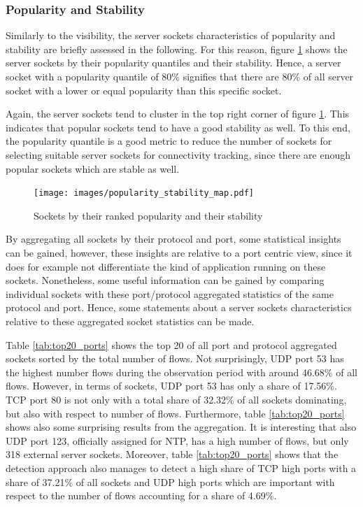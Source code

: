 \subsubsection{Popularity and Stability}

Similarly to the visibility, the \glspl{server socket} characteristics of popularity and stability are briefly assessed in the following. 
For this reason, figure \ref{fig:rankedPopularity} shows the \glspl{server socket} by their popularity quantiles and their stability. 
Hence, a \gls{server socket} with a popularity quantile of 80\% signifies that there are 80\% of all \gls{server socket} with a lower or equal popularity than this specific socket.

Again, the \glspl{server socket} tend to cluster in the top right corner of figure \ref{fig:rankedPopularity}. This indicates that popular sockets tend to have a good stability as well.
To this end, the popularity quantile is a good metric to reduce the number of sockets for selecting suitable server sockets for connectivity tracking, since there are enough popular sockets which are stable as well. 
\begin{figure}
	[ht] \centering 
	\texttt{[image: images/popularity\_stability\_map.pdf]} \caption{Sockets by their ranked popularity and their stability} 
	\label{fig:rankedPopularity} 
\end{figure}

By aggregating all sockets by their protocol and port, some statistical insights can be gained, however, these insights are relative to a port centric view, since it does for example not differentiate the kind of application running on these sockets. 
Nonetheless, some useful information can be gained by comparing individual sockets with these port/protocol aggregated statistics of the same protocol and port. 
Hence, some statements about a server sockets characteristics relative to these aggregated socket statistics can be made.

Table \ref{tab:top20_ports} shows the top 20 of all port and protocol aggregated sockets sorted by the total number of flows. Not surprisingly, UDP port 53 has the highest number flows during the observation period with around 46.68\% of all flows. 
However, in terms of sockets, UDP port 53 has only a share of 17.56\%. 
TCP port 80 is not only with a total share of 32.32\% of all sockets dominating, but also with respect to number of flows. Furthermore, table \ref{tab:top20_ports} shows also some surprising results from the aggregation. 
It is interesting that also UDP port 123, officially assigned for \gls{NTP}, has a high number of flows, but only 318 external server sockets. Moreover, table \ref{tab:top20_ports} shows that the detection approach also manages to detect a high share of TCP high ports with a share of 37.21\% of all sockets and UDP high ports which are important with respect to the number of flows accounting for a share of 4.69\%.

